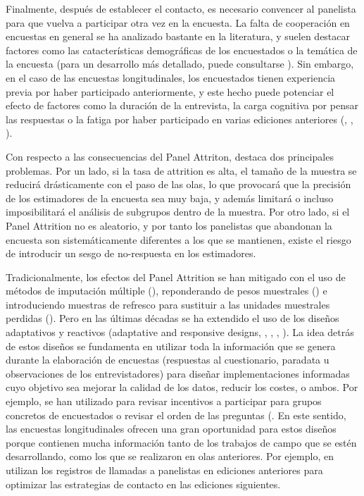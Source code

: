 Finalmente, después de establecer el contacto, es necesario convencer al panelista para que vuelva a participar otra vez en la encuesta. La falta de cooperación en encuestas en general se ha analizado bastante en la literatura, y suelen destacar factores como las catacterísticas demográficas de los encuestados o la temática de la encuesta (para un desarrollo más detallado, puede consultarse \cite{groves1992understanding}). Sin embargo, en el caso de las encuestas longitudinales, los encuestados tienen experiencia previa por haber participado anteriormente, y este hecho puede potenciar el efecto de factores como la duración de la entrevista, la carga cognitiva por pensar las respuestas o la fatiga por haber participado en varias ediciones anteriores (\cite{laurie1999strategies}, \cite{watson2009identifying}, \cite{lynn2018tackling}).

Con respecto a las consecuencias del Panel Attriton, \cite{lynn2018tackling} destaca dos principales problemas. Por un lado, si la tasa de attrition es alta, el tamaño de la muestra se reducirá drásticamente con el paso de las olas, lo que provocará que la precisión de los estimadores de la encuesta sea muy baja, y además limitará o incluso imposibilitará el análisis de subgrupos dentro de la muestra. Por otro lado, si el Panel Attrition no es aleatorio, y por tanto los panelistas que abandonan la encuesta son sistemáticamente diferentes a los que se mantienen, existe el riesgo de introducir un sesgo de no-respuesta en los estimadores.

Tradicionalmente, los efectos del Panel Attrition se han mitigado con el uso de métodos de imputación múltiple (\cite{rubin1987multiple}), reponderando de pesos muestrales (\cite{groves2009survey}) e introduciendo muestras de refresco para sustituir a las unidades muestrales perdidas (\cite{hirano1998combining}). Pero en las últimas décadas se ha extendido el uso de los diseños adaptativos y reactivos (adaptative and responsive designs, \cite{groves2006responsive}, \cite{wagner2008adaptive}, \cite{schouten2017adaptive}, \cite{tourangeau2017adaptive}). La idea detrás de estos diseños se fundamenta en utilizar toda la información que se genera durante la elaboración de encuestas (respuestas al cuestionario, paradata u observaciones de los entrevistadores) para diseñar implementaciones informadas cuyo objetivo sea mejorar la calidad de los datos, reducir los costes, o ambos. Por ejemplo, se han utilizado para revisar incentivos a participar para grupos concretos de encuestados \cite{mcgonagle2022effects} o revisar el orden de las preguntas (\cite{early2017dynamic}. En este sentido, las encuestas longitudinales ofrecen una gran oportunidad para estos diseños porque contienen mucha información tanto de los trabajos de campo que se estén desarrollando, como los que se realizaron en olas anteriores. Por ejemplo, en \cite{kreuter2015note} utilizan los registros de llamadas a panelistas en ediciones anteriores para optimizar las estrategias de contacto en las ediciones siguientes.


